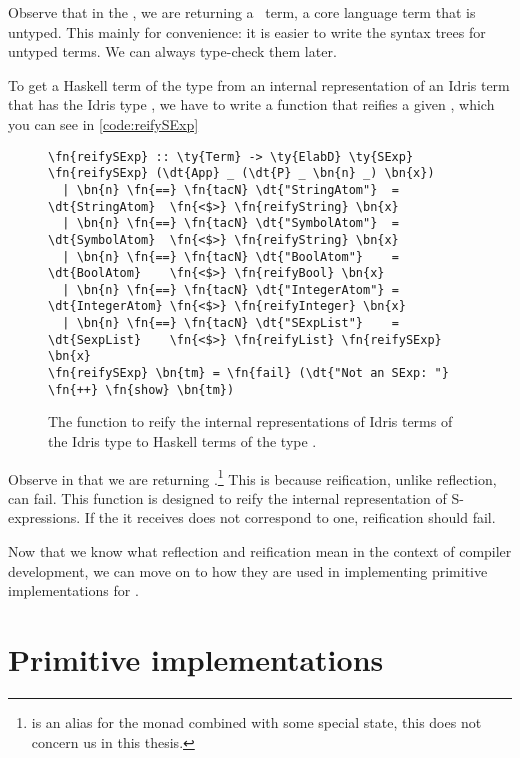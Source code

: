 Observe that in the , we are returning a \Raw\ term, a core
language term that is untyped. This mainly for convenience: it is easier to
write the syntax trees for untyped terms. We can always type-check them later.

To get a Haskell term of the type  from an internal representation of
an Idris term that has the Idris type , we have to write a function
 that reifies a given , which you can see in
\autoref{code:reifySExp}

\begin{figure}[ht]
\caption{The function to reify the internal representations of Idris terms
  of the Idris type  to Haskell terms of the type .}
\label{code:reifySExp}
\begin{Verbatim}[framesep=2mm, label=\footnotesize{\normalfont{Haskell}}, labelposition=topline]
\fn{reifySExp} :: \ty{Term} -> \ty{ElabD} \ty{SExp}
\fn{reifySExp} (\dt{App} _ (\dt{P} _ \bn{n} _) \bn{x})
  | \bn{n} \fn{==} \fn{tacN} \dt{"StringAtom"}  = \dt{StringAtom}  \fn{<$>} \fn{reifyString} \bn{x}
  | \bn{n} \fn{==} \fn{tacN} \dt{"SymbolAtom"}  = \dt{SymbolAtom}  \fn{<$>} \fn{reifyString} \bn{x}
  | \bn{n} \fn{==} \fn{tacN} \dt{"BoolAtom"}    = \dt{BoolAtom}    \fn{<$>} \fn{reifyBool} \bn{x}
  | \bn{n} \fn{==} \fn{tacN} \dt{"IntegerAtom"} = \dt{IntegerAtom} \fn{<$>} \fn{reifyInteger} \bn{x}
  | \bn{n} \fn{==} \fn{tacN} \dt{"SExpList"}    = \dt{SexpList}    \fn{<$>} \fn{reifyList} \fn{reifySExp} \bn{x}
\fn{reifySExp} \bn{tm} = \fn{fail} (\dt{"Not an SExp: "} \fn{++} \fn{show} \bn{tm})
\end{Verbatim}
\end{figure}

Observe in  that we are returning
.\footnote{ is an alias for the  monad
combined with some special state, this does not concern us in this thesis.}
This is because reification, unlike reflection, can fail. This function is
designed to reify the internal representation of S-expressions. If the
 it receives does not correspond to one, reification should fail.

Now that we know what reflection and reification mean in the context of compiler
development, we can move on to how they are used in implementing primitive
implementations for .

\section{Primitive  implementations}\label{sec:primitiveEditorableImpl}

